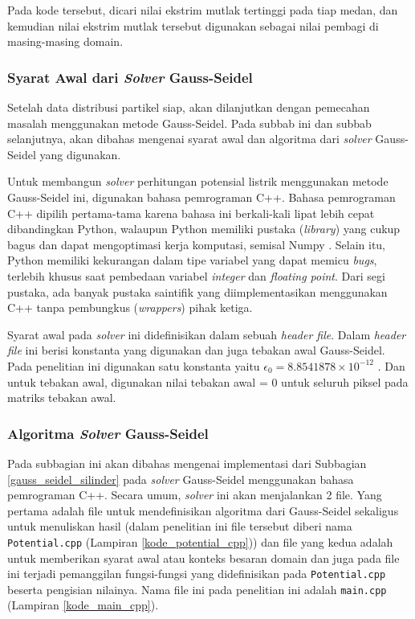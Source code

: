Pada kode tersebut, dicari nilai ekstrim mutlak tertinggi pada tiap medan, dan kemudian nilai ekstrim mutlak tersebut digunakan sebagai nilai pembagi di masing-masing domain.

\subsubsection{Syarat Awal dari \textit{Solver} Gauss-Seidel}

Setelah data distribusi partikel siap, akan dilanjutkan dengan pemecahan masalah menggunakan metode Gauss-Seidel. Pada subbab ini dan subbab selanjutnya, akan dibahas mengenai syarat awal dan algoritma dari \textit{solver} Gauss-Seidel yang digunakan.

Untuk membangun \textit{solver} perhitungan potensial listrik menggunakan metode Gauss-Seidel ini, digunakan bahasa pemrograman C++. Bahasa pemrograman C++ dipilih pertama-tama karena bahasa ini berkali-kali lipat lebih cepat dibandingkan Python, walaupun Python memiliki pustaka (\textit{library}) yang cukup bagus dan dapat mengoptimasi kerja komputasi, semisal Numpy \citep{lubos_brieda_2019}. Selain itu, Python memiliki kekurangan dalam tipe variabel yang dapat memicu \textit{bugs}, terlebih khusus saat pembedaan variabel \textit{integer} dan \textit{floating point}. Dari segi pustaka, ada banyak pustaka saintifik yang diimplementasikan menggunakan C++ tanpa pembungkus (\textit{wrappers}) pihak ketiga.

Syarat awal pada \textit{solver} ini didefinisikan dalam sebuah \textit{header file}. Dalam \textit{header file} ini berisi konstanta yang digunakan dan juga tebakan awal Gauss-Seidel. Pada penelitian ini digunakan satu konstanta yaitu $\epsilon_0 = 8.8541878 \times 10^{-12}$ \citep{lubos_brieda_2019}. Dan untuk tebakan awal, digunakan nilai tebakan awal = 0 untuk seluruh piksel pada matriks tebakan awal.

\subsubsection{Algoritma \textit{Solver} Gauss-Seidel}

Pada subbagian ini akan dibahas mengenai implementasi dari Subbagian \ref{gauss_seidel_silinder} pada \textit{solver} Gauss-Seidel menggunakan bahasa pemrograman C++. Secara umum, \textit{solver} ini akan menjalankan 2 file. Yang pertama adalah file untuk mendefinisikan algoritma dari Gauss-Seidel sekaligus untuk menuliskan hasil (dalam penelitian ini file tersebut diberi nama \texttt{Potential.cpp} (Lampiran \ref{kode_potential_cpp})) dan file yang kedua adalah untuk memberikan syarat awal atau konteks besaran domain dan juga pada file ini terjadi pemanggilan fungsi-fungsi yang didefinisikan pada \texttt{Potential.cpp} beserta pengisian nilainya. Nama file ini pada penelitian ini adalah \texttt{main.cpp} (Lampiran \ref{kode_main_cpp}). 

